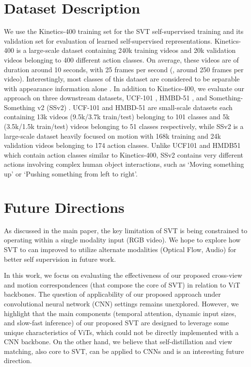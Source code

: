\documentclass[10pt,twocolumn,letterpaper]{article}
\begin{document}
\section{Dataset Description}

We use the Kinetics-400 \cite{kinetics400} training set for the SVT self-supervised training and its validation set for evaluation of learned self-supervised representations. 
Kinetics-400 is a large-scale dataset containing 240k training videos and 20k validation videos belonging to 400 different action classes. 
On average, these videos are of duration around 10 seconds, with 25 frames per second (\ie, around 250 frames per video). Interestingly, most classes of this dataset are considered to be separable with appearance information alone \cite{zhu_arxiv2020_comprehensiveVideo}.
In addition to Kinetics-400, we evaluate our approach on three downstream datasets, UCF-101 \cite{soomro2012ucf}, HMBD-51 \cite{kuehne2011hmdb}, and Something-Something v2 (SSv2) \cite{goyal2017something}. UCF-101 and  HMBD-51 are small-scale datasets each containing 13k videos (9.5k/3.7k train/test) belonging to 101 classes and 5k (3.5k/1.5k train/test) videos belonging to 51 classes respectively, while SSv2 is a large-scale dataset heavily focused on motion with 168k training and 24k validation videos belonging to 174 action classes. Unlike UCF101 and HMDB51 which contain action classes similar to Kinetics-400, SSv2 contains very different actions involving complex human object interactions, such as `Moving something up' or `Pushing something from left to right'. 


\section{Future Directions}
As discussed in the main paper, the key limitation of SVT is being constrained to operating within a single modality input (RGB video). We hope to explore how SVT to can improved to utilize alternate modalities (Optical Flow, Audio) for better self supervision in future work. 

In this work, we focus on evaluating the effectiveness of our proposed cross-view and motion correspondences (that compose the core of SVT) in relation to ViT backbones. The question of applicability of our proposed approach under convolutional neural network (CNN) settings remains unexplored. However, we highlight that the  main components (temporal attention, dynamic input sizes, and slow-fast inference) of our proposed SVT are designed to leverage some unique characteristics of ViTs, which could not be directly implemented with a CNN backbone. On the other hand, we believe that self-distillation and view matching, also core to SVT, can be applied to CNNs and is an interesting future direction.
\end{document}
